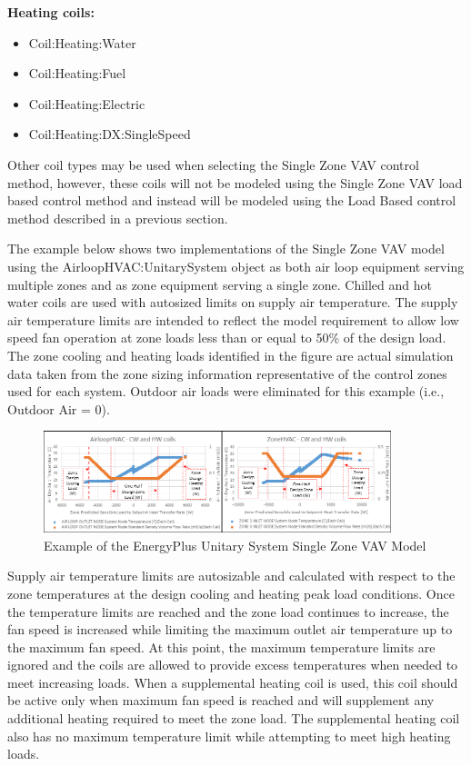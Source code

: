\textbf{Heating coils:}
\begin{itemize}
\item Coil:Heating:Water
\item Coil:Heating:Fuel
\item Coil:Heating:Electric
\item Coil:Heating:DX:SingleSpeed
\end{itemize}

Other coil types may be used when selecting the Single Zone VAV control method, however, these coils will not be modeled using the Single Zone VAV load based control method and instead will be modeled using the Load Based control method described in a previous section.

The example below shows two implementations of the Single Zone VAV model using the AirloopHVAC:UnitarySystem object as both air loop equipment serving multiple zones and as zone equipment serving a single zone. Chilled and hot water coils are used with autosized limits on supply air temperature. The supply air temperature limits are intended to reflect the model requirement to allow low speed fan operation at zone loads less than or equal to 50\% of the design load. The zone cooling and heating loads identified in the figure are actual simulation data taken from the zone sizing information representative of the control zones used for each system. Outdoor air loads were eliminated for this example (i.e., Outdoor Air = 0).

\begin{figure}[hbtp]
\centering
\includegraphics[width=0.9\textwidth, height=0.9\textheight, keepaspectratio=true]{media/UnitarySystem_SZVAV_watercoils.png}
\caption{Example of the EnergyPlus Unitary System Single Zone VAV Model \protect \label{fig:example-of-the-energyplus-unitary-system-single-zone-vav-model}}
\end{figure}

Supply air temperature limits are autosizable and calculated with respect to the zone temperatures at the design cooling and heating peak load conditions. Once the temperature limits are reached and the zone load continues to increase, the fan speed is increased while limiting the maximum outlet air temperature up to the maximum fan speed. At this point, the maximum temperature limits are ignored and the coils are allowed to provide excess temperatures when needed to meet increasing loads. When a supplemental heating coil is used, this coil should be active only when maximum fan speed is reached and will supplement any additional heating required to meet the zone load. The supplemental heating coil also has no maximum temperature limit while attempting to meet high heating loads.

